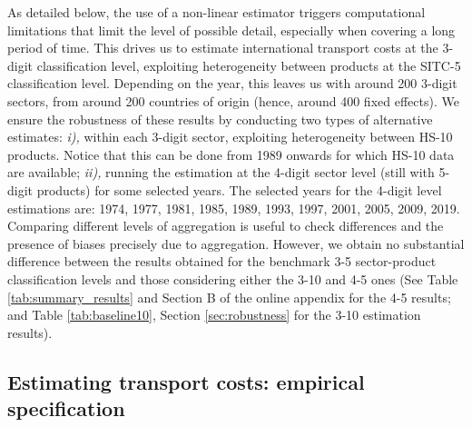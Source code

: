 \documentclass[a4paper,11pt]{article}
\begin{document}
As detailed below, the use of a non-linear estimator triggers computational limitations that limit the level of possible detail, especially when covering a long period of time. This drives us to estimate international transport costs at the 3-digit classification level, exploiting heterogeneity between products at the SITC-5 classification level. Depending on the year, this leaves us with around 200 3-digit sectors, from around 200 countries of origin (hence, around 400 fixed effects). We ensure the robustness of these results by conducting two types of alternative estimates: \textit{i),} within each 3-digit sector, exploiting heterogeneity between HS-10 products. Notice that this can be done from 1989 onwards for which HS-10 data are available; \textit{ii),} running the estimation at the 4-digit sector level (still with 5-digit products) for some selected years. The selected years for the 4-digit level estimations are: 1974, 1977, 1981, 1985, 1989, 1993, 1997, 2001, 2005, 2009, 2019. Comparing different levels of aggregation is useful to check differences and the presence of biases precisely due to aggregation. However, we obtain no substantial difference between the results obtained for the benchmark 3-5 sector-product classification levels and those considering either the 3-10 and 4-5 ones (See Table \ref{tab:summary_results} and Section B of the online appendix for the 4-5 results; and Table \ref{tab:baseline10}, Section \ref{sec:robustness} for the 3-10 estimation results).



\subsection{Estimating transport costs: empirical specification \label{sec:estimation_strat}}
\end{document}
